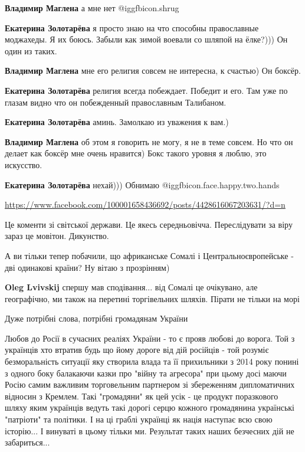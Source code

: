\begin{itemize}
\begin{itemize}
\textbf{Владимир Маглена} а мне нет @igg{fbicon.shrug} 

\textbf{Екатерина Золотарёва} я просто знаю на что способны православные моджахеды. Я их боюсь. Забыли как зимой воевали со шляпой на ёлке?))) Он один из таких.


\textbf{Владимир Маглена} мне его религия совсем не интересна, к счастью) Он боксёр.

\textbf{Екатерина Золотарёва} религия всегда побеждает. Победит и его. Там уже по глазам видно что он побежденный православным Талибаном.

\textbf{Екатерина Золотарёва} аминь. Замолкаю из уважения к вам.)


\textbf{Владимир Маглена} об этом я говорить не могу, я не в теме совсем. Но что он делает как боксёр мне очень нравится) Бокс такого уровня я люблю, это искусство.

\textbf{Екатерина Золотарёва} нехай))) Обнимаю  @igg{fbicon.face.happy.two.hands} 
\end{itemize} %

\url{https://www.facebook.com/100001658436692/posts/4428616067203631/?d=n}

Це коменти зі світської держави. Це якесь середньовічча. Переслідувати за віру зараз це мовітон. Дикунство.

\begin{itemize} %
А ви тільки тепер побачили, що африканське Сомалі і Центральноєвропейське - дві одинакові країни?
Ну вітаю з прозрінням)

\textbf{Oleg Lvivskij} спершу мав сподівання... від Сомалі це очікувано, але географічно, ми також на перетині торгівельних шляхів. Пірати не тільки на морі
\end{itemize} %

Дуже потрібні слова, потрібні громадянам України


Любов до Росії в сучасних реаліях України - то є прояв любові до ворога. Той з
українців хто втратив будь що йому дороге від дій російців - той розуміє
безморальність ситуації яку створила влада та її прихильники з 2014 року понині
з одного боку балакаючи казки про "війну та агресора" при цьому досі маючи
Росію самим важливим торговельним партнером зі збереженням дипломатичних
відносин з Кремлем. Такі "громадяни" як цей усік - це продукт поразкового шляху
яким українців ведуть такі дорогі серцю кожного громадянина українські
"патріоти" та політики. І на ці граблі українці як нація наступає всю свою
історію... І винуваті в цьому тільки ми. Результат таких наших безчесних дій не
забариться...


\end{itemize}
